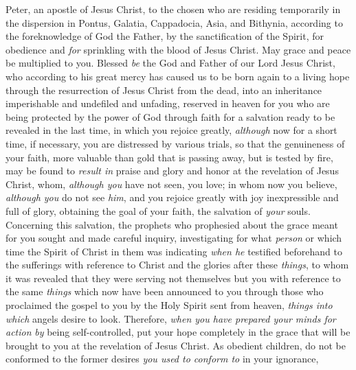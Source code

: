 
\begin{biblechapter} %
 Peter, an apostle of Jesus Christ, to the chosen who are residing temporarily in the dispersion in Pontus, Galatia, Cappadocia, Asia, and Bithynia,
\verse according to the foreknowledge of God the Father, by the sanctification of the Spirit, for obedience and \textit{for} sprinkling with the blood of Jesus Christ. May grace and peace be multiplied to you.
 Blessed \textit{be} the God and Father of our Lord Jesus Christ, who according to his great mercy has caused us to be born again to a living hope through the resurrection of Jesus Christ from the dead,
\verse into an inheritance imperishable and undefiled and unfading, reserved in heaven for you
\verse who are being protected by the power of God through faith for a salvation ready to be revealed in the last time,
\verse in which you rejoice greatly, \textit{although} now for a short time, if necessary, you are distressed by various trials,
\verse so that the genuineness of your faith, more valuable than gold that is passing away, but is tested by fire, may be found to \textit{result in} praise and glory and honor at the revelation of Jesus Christ,
\verse whom, \textit{although you} have not seen, you love; in whom now you believe, \textit{although you} do not see \textit{him}, and you rejoice greatly with joy inexpressible and full of glory,
\verse obtaining the goal of your faith, the salvation of \textit{your} souls.
\verse Concerning this salvation, the prophets who prophesied about the grace meant for you sought and made careful inquiry,
\verse investigating for what \textit{person} or which time the Spirit of Christ in them was indicating \textit{when he} testified beforehand to the sufferings with reference to Christ and the glories after these \textit{things},
\verse to whom it was revealed that they were serving not themselves but you with reference to the same \textit{things} which now have been announced to you through those who proclaimed the gospel to you by the Holy Spirit sent from heaven, \textit{things into which} angels desire to look.
 Therefore, \textit{when you have prepared your minds for action} \textit{by} being self-controlled, put your hope completely in the grace that will be brought to you at the revelation of Jesus Christ.
\verse As obedient children, do not be conformed to the former desires \textit{you used to conform to} in your ignorance,

\end{biblechapter}
